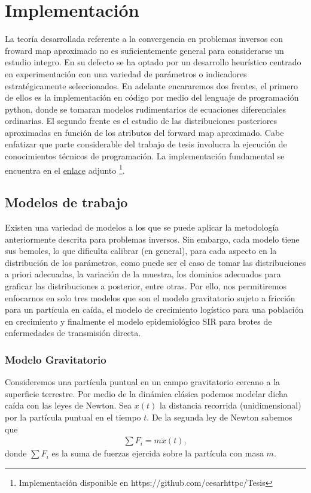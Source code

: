 \chapter{Implementación} 

La teoría desarrollada referente a la convergencia en problemas inversos con froward map aproximado no es suficientemente general para considerarse un estudio integro. En su defecto se ha optado por un desarrollo heurístico centrado en experimentación con una variedad de parámetros o indicadores estratégicamente seleccionados. En adelante encararemos dos frentes, el primero de ellos es la implementación en código por medio del lenguaje de programación python, donde se tomaran modelos rudimentarios de ecuaciones diferenciales ordinarias. El segundo frente es el estudio de las distribuciones posteriores aproximadas en función de los atributos del forward map aproximado. Cabe enfatizar que parte considerable del trabajo de tesis involucra la ejecución de conocimientos técnicos de programación. La implementación fundamental se encuentra en el \href{https://github.com/cesarhttpc/Tesis}{enlace} adjunto \footnote{Implementación disponible en https://github.com/cesarhttpc/Tesis}.

\section{Modelos de trabajo}

Existen una variedad de modelos a los que se puede aplicar la metodología anteriormente descrita para problemas inversos. Sin embargo, cada modelo tiene sus bemoles, lo que dificulta calibrar (en general), para cada aspecto en la distribución de los parámetros, como puede ser el caso de tomar las distribuciones a priori adecuadas, la variación de la muestra, los dominios adecuados para graficar las distribuciones a posterior, entre otras. Por ello, nos permitiremos enfocarnos en solo tres modelos que son el modelo gravitatorio sujeto a fricción para un partícula en caída, el modelo de crecimiento logístico para una población en crecimiento y finalmente el modelo epidemiológico SIR para brotes de enfermedades de transmisión directa.


\subsection{Modelo Gravitatorio}

Consideremos una partícula puntual en un campo gravitatorio cercano a la superficie terrestre. Por medio de la dinámica clásica podemos modelar dicha caída con las leyes de Newton. Sea $x(t)$ la distancia recorrida (unidimensional) por la partícula puntual en el tiempo $t$. De la segunda ley de Newton sabemos que
\begin{align}
    \sum F_i = m\ddot{x}(t),
    \label{3.1.01}
\end{align}
donde $\sum F_i$ es la suma de fuerzas ejercida sobre la partícula con masa $m$. 

